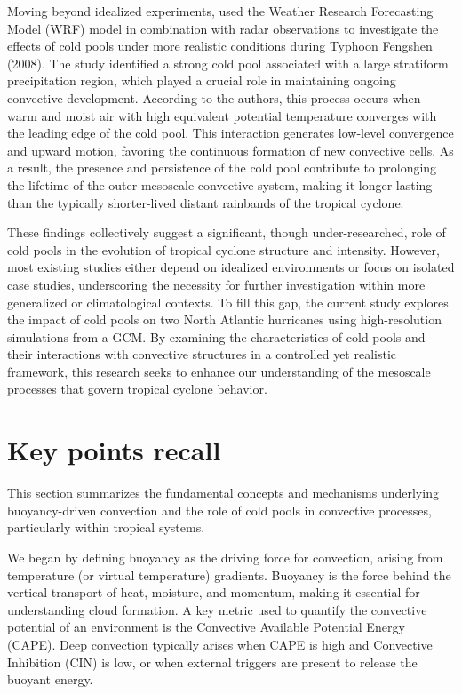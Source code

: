 Moving beyond idealized experiments,  used the Weather Research Forecasting Model (WRF) model in combination with radar observations to investigate the effects of cold pools under more realistic conditions during Typhoon Fengshen (2008). The study identified a strong cold pool associated with a large stratiform precipitation region, which played a crucial role in maintaining ongoing convective development. According to the authors, this process occurs when warm and moist air with high equivalent potential temperature converges with the leading edge of the cold pool. This interaction generates low-level convergence and upward motion, favoring the continuous formation of new convective cells. As a result, the presence and persistence of the cold pool contribute to prolonging the lifetime of the outer mesoscale convective system, making it longer-lasting than the typically shorter-lived distant rainbands of the tropical cyclone.

These findings collectively suggest a significant, though under-researched, role of cold pools in the evolution of tropical cyclone structure and intensity. However, most existing studies either depend on idealized environments or focus on isolated case studies, underscoring the necessity for further investigation within more generalized or climatological contexts. To fill this gap, the current study explores the impact of cold pools on two North Atlantic hurricanes using high-resolution simulations from a GCM. By examining the characteristics of cold pools and their interactions with convective structures in a controlled yet realistic framework, this research seeks to enhance our understanding of the mesoscale processes that govern tropical cyclone behavior.

\section{Key points recall}
\label{section26}

This section summarizes the fundamental concepts and mechanisms underlying buoyancy-driven convection and the role of cold pools in convective processes, particularly within tropical systems.

We began by defining buoyancy as the driving force for convection, arising from temperature (or virtual temperature) gradients. Buoyancy is the force behind the vertical transport of heat, moisture, and momentum, making it essential for understanding cloud formation. A key metric used to quantify the convective potential of an environment is the Convective Available Potential Energy (CAPE). Deep convection typically arises when CAPE is high and Convective Inhibition (CIN) is low, or when external triggers are present to release the buoyant energy.


